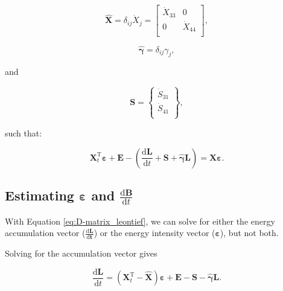 \documentclass[authoryear,preprint,review,12pt]{elsarticle}
\let\oldhat\hat
\renewcommand{\vec}[1]{\mathbf{#1}}
\renewcommand{\hat}[1]{\oldhat{\mathbf{#1}}}
\begin{document}
\begin{equation} \label{eq:D-X_hat_matrix_def}
	\hat{\vec{X}} = \delta_{ij}\dot{X}_{j} = \begin{bmatrix} 	\dot{X}_{33}		&	0					\\
																								0					&	\dot{X}_{44}	\\
																							\end{bmatrix},
\end{equation}


\begin{equation} \label{eq:D-B_hat_matrix_def}
	\hat{\vec{\gamma}} = \delta_{ij}\gamma_{j},
\end{equation}

\noindent and

\begin{equation} \label{eq:D-S_vec_def}
	\vec{S} =		\begin{Bmatrix} 	\dot{S}_{31}	\\
													\dot{S}_{41}\\
						\end{Bmatrix},
\end{equation}

\noindent such that:

\begin{equation} \label{D-eq:matrix_leontief}
	\vec{X}_{t}^{\mathrm{T}}\vec{\varepsilon} + \vec{E} - \left(\frac{\mathrm{d}\vec{L}}{\mathrm{d}t} +\vec{S} + \hat{\vec{\gamma}}\vec{L}\right) = \hat{\vec{X}}\vec{\varepsilon}.
\end{equation}

\subsection{Estimating $\vec{\varepsilon}$ and $\frac{\mathrm{d}\vec{B}}{\mathrm{d}t}$}

With Equation \ref{eq:D-matrix_leontief}, we can solve for either the energy accumulation vector ($\vec{\frac{\mathrm{d}L}{\mathrm{d}t}}$) or the energy intensity vector ($\vec{\varepsilon}$), but not both. 

Solving for the accumulation vector gives

\begin{equation} \label{eq:D-dL_dt_leontief}
	\frac{\mathrm{d}\vec{L}}{\mathrm{d}t} = (\vec{X}_{t}^{\mathrm{T}} - \hat{\vec{X}})\vec{\varepsilon} + \vec{E} - \vec{S} - \hat{\vec{\gamma}}\vec{L}.
\end{equation}
\end{document}
